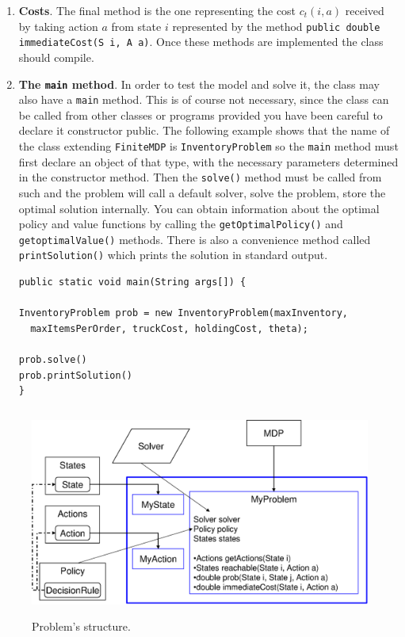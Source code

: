 \documentclass[11pt]{article}
\newcommand {\lil}{\lstinline}
\begin{document}
\begin{enumerate}
\item \textbf{Costs}. The final method is the one representing the cost $c_t(i,a)$ received by taking action $a$ from state $i$ represented by the method \lstinline!public double immediateCost(S i, A a)!. Once these methods are implemented the class should compile.

\item \textbf{The \lstinline!main! method}. In order to test the model and solve it, the class may also have a \lstinline!main! method. This is of course not necessary, since the class can be called from other classes or programs provided you have been careful to declare it constructor public. The following example shows that the name of the class extending \lstinline!FiniteMDP! is \lstinline!InventoryProblem! so the \lstinline!main! method must first declare an object of that type, with the necessary parameters determined in the constructor method. Then the \lstinline!solve()! method must be called from such and the problem will call a default solver, solve the problem, store the optimal solution internally. You can obtain information about the optimal policy and value functions by calling the \lil!getOptimalPolicy()! and \lil!getoptimalValue()! methods. There is also a convenience method called \lil!printSolution()! which prints the solution in standard output.


\begin{lstlisting}
public static void main(String args[]) {

InventoryProblem prob = new InventoryProblem(maxInventory,
  maxItemsPerOrder, truckCost, holdingCost, theta);

prob.solve()
prob.printSolution()
}
\end{lstlisting}
\end{enumerate}

\begin{figure}[htb]  \centering
  \includegraphics[height=2.7in]{ProblemStructure}%
  \caption{Problem's structure.}
\end{figure}
\end{document}
